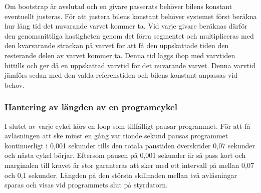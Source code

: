 Om bootstrap är avslutad och en givare passerats behöver bilens konstant
eventuellt justeras. För att justera bilens konstant behöver systemet först beräkna hur lång tid det
nuvarande varvet kommer ta. Vid varje givare beräknas därför den genomsnittliga
hastigheten genom det förra segmentet och multipliceras med den kvarvarande
sträckan på varvet för att få den uppskattade tiden den resterande delen av
varvet kommer ta. Denna tid läggs ihop med varvtiden hittills och ger då en
uppskattad varvtid för det nuvarande varvet. Denna varvtid jämförs sedan med den
valda referenstiden och bilens konstant anpassas vid behov.

%  



\subsubsection{Hantering av längden av en programcykel}
\label{sec:system:korning:cykel}

I slutet av varje cykel körs en loop som tillfälligt pausar programmet.  För att
få avläsningen att ske minst en gång var tionde sekund pausas programmet
kontinuerligt i 0,001 sekunder tills den totala paustiden överskrider 0,07
sekunder och nästa cykel börjar. Eftersom pausen på 0,001 sekunder är så pass
kort och marginalen till kravet är stor garanteras att sker med ett intervall på
mellan 0,07 och 0,1 sekunder. Längden på den största skillnaden mellan två
avläsningar sparas och visas vid programmets slut på styrdatorn.

